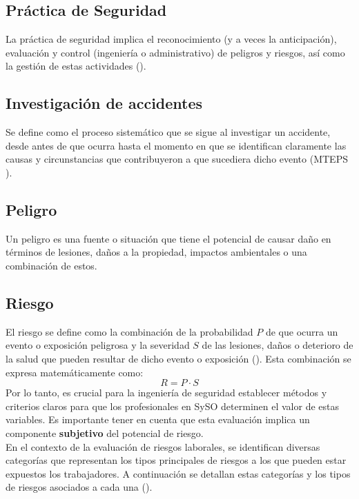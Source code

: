 \subsection{Práctica de Seguridad}
La práctica de seguridad implica el reconocimiento (y a veces la anticipación), evaluación y control (ingeniería o administrativo) de peligros y riesgos, así como la gestión de estas actividades (\cite{brauer2022safety}).

\subsection{Investigación de accidentes}
Se define como el proceso sistemático que se sigue al investigar un accidente, desde antes de que ocurra hasta el momento en que se identifican claramente las causas y circunstancias que contribuyeron a que sucediera dicho evento (MTEPS \citeyear{Bolivia1979}).

\subsection{Peligro}
Un peligro es una fuente o situación que tiene el potencial de causar daño en términos de lesiones, daños a la propiedad, impactos ambientales o una combinación de estos.

\subsection{Riesgo}
El riesgo se define como la combinación de la probabilidad \( P \) de que ocurra un evento o exposición peligrosa y la severidad \( S \) de las lesiones, daños o deterioro de la salud que pueden resultar de dicho evento o exposición (\cite{NTS-009/18}). Esta combinación se expresa matemáticamente como:
\begin{equation}
    R = P \cdot S
\end{equation}
Por lo tanto, es crucial para la ingeniería de seguridad establecer métodos y criterios claros para que los profesionales en SySO determinen el valor de estas variables. Es importante tener en cuenta que esta evaluación implica un componente \textbf{subjetivo} del potencial de riesgo.\\
En el contexto de la evaluación de riesgos laborales, se identifican diversas categorías que representan los tipos principales de riesgos a los que pueden estar expuestos los trabajadores. A continuación se detallan estas categorías y los tipos de riesgos asociados a cada una (\cite{cahuasiquitadiseno}).

